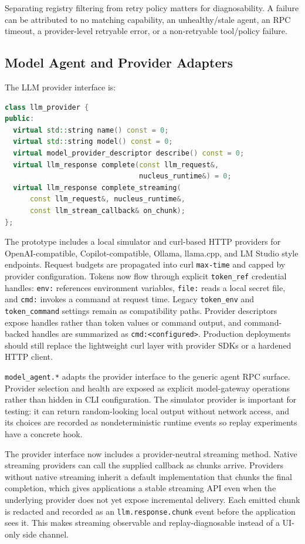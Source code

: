 \documentclass[manuscript,screen,review]{acmart}
\begin{document}
Separating registry filtering from retry policy matters for diagnosability. A
failure can be attributed to no matching capability, an unhealthy/stale agent, an
RPC timeout, a provider-level retryable error, or a non-retryable tool/policy
failure.

\subsection{Model Agent and Provider Adapters}

The LLM provider interface is:

\begin{lstlisting}[language=C++]
class llm_provider {
public:
  virtual std::string name() const = 0;
  virtual std::string model() const = 0;
  virtual model_provider_descriptor describe() const = 0;
  virtual llm_response complete(const llm_request&,
                                nucleus_runtime&) = 0;
  virtual llm_response complete_streaming(
      const llm_request&, nucleus_runtime&,
      const llm_stream_callback& on_chunk);
};
\end{lstlisting}

The prototype includes a local simulator and curl-based HTTP providers for
OpenAI-compatible, Copilot-compatible, Ollama, llama.cpp, and LM Studio style
endpoints. Request budgets are propagated into curl \texttt{max-time} and
capped by provider configuration. Tokens now flow through explicit
\texttt{token\_ref} credential handles: \texttt{env:} references environment
variables, \texttt{file:} reads a local secret file, and \texttt{cmd:} invokes a
command at request time. Legacy \texttt{token\_env} and
\texttt{token\_command} settings remain as compatibility paths. Provider
descriptors expose handles rather than token values or command output, and
command-backed handles are summarized as \texttt{cmd:<configured>}. Production
deployments should still replace the lightweight curl layer with provider SDKs
or a hardened HTTP client.

\texttt{model\_agent.*} adapts the provider interface to the generic agent RPC
surface. Provider selection and health are exposed as explicit model-gateway
operations rather than hidden in CLI configuration. The simulator provider is
important for testing: it can return random-looking local output without network
access, and its choices are recorded as nondeterministic runtime events so replay
experiments have a concrete hook.

The provider interface now includes a provider-neutral streaming method. Native
streaming providers can call the supplied callback as chunks arrive. Providers
without native streaming inherit a default implementation that chunks the final
completion, which gives applications a stable streaming API even when the
underlying provider does not yet expose incremental delivery. Each emitted chunk
is redacted and recorded as an \texttt{llm.response.chunk} event before the
application sees it. This makes streaming observable and replay-diagnosable
instead of a UI-only side channel.
\end{document}
